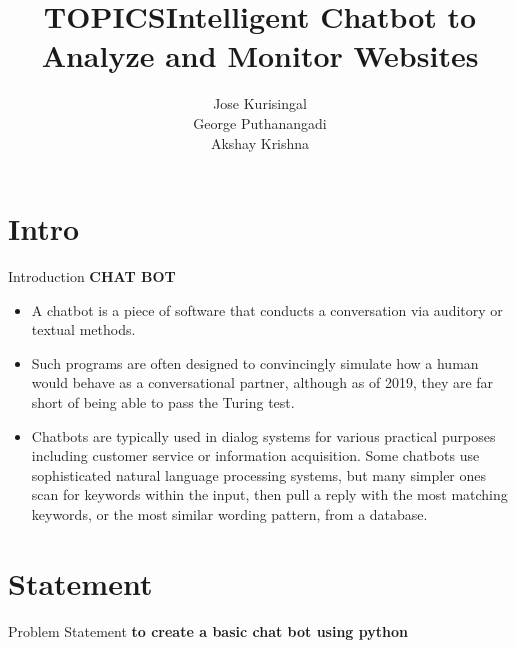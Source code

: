\documentclass{beamer}
\title{TOPICS}
\begin{document}
                
           
                 \begin{frame}
                \title{Intelligent Chatbot to Analyze and Monitor Websites}
                \author{Jose Kurisingal\\George Puthanangadi\\Akshay Krishna}
                \date{}
                \maketitle                                                                                              
                            
                \end{frame}

                \section{Intro}
                \begin{frame}{Introduction}
                \textbf{CHAT BOT}
                \begin{itemize}
                \item A chatbot is a piece of software that conducts a conversation via auditory or textual methods.
               \medskip
               	\item Such programs are often designed to convincingly simulate how a human would behave as a conversational partner, although as of 2019, they are far short of being able to pass the Turing test.
               	 \medskip
               	\item Chatbots are typically used in dialog systems for various practical purposes including customer service or information acquisition. Some chatbots use sophisticated natural language processing systems, but many simpler ones scan for keywords within the input, then pull a reply with the most matching keywords, or the most similar wording pattern, from a database. 
                \end{itemize}
                
                \end{frame}
                \section{Statement}
                \begin{frame}{Problem Statement}
                \textbf{to create a basic chat bot using python}
                \end{frame}
\end{document}
